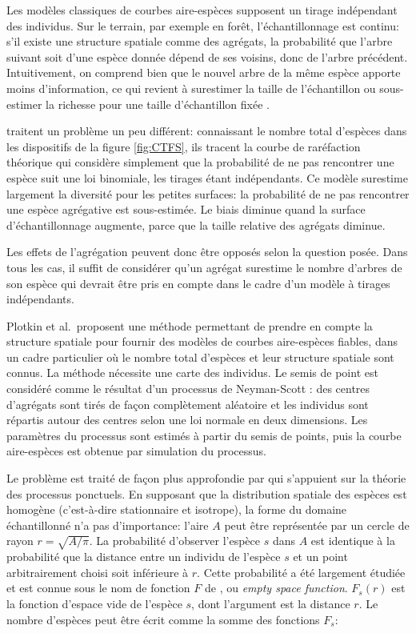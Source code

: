 \documentclass[
  11pt,
  french,
  a4paper,
  extrafontsizes,onecolumn,openright
  ]{memoir}
\newlength{\rf}
\begin{document}
Les modèles classiques de courbes aire-espèces supposent un tirage indépendant des individus.
Sur le terrain, par exemple en forêt, l'échantillonnage est continu: s'il existe une structure spatiale comme des agrégats, la probabilité que l'arbre suivant soit d'une espèce donnée dépend de ses voisins, donc de l'arbre précédent.
Intuitivement, on comprend bien que le nouvel arbre de la même espèce apporte moins d'information, ce qui revient à surestimer la taille de l'échantillon ou sous-estimer la richesse pour une taille d'échantillon fixée \autocite{Veech2005}.

\textcite{Plotkin2000a} traitent un problème un peu différent: connaissant le nombre total d'espèces dans les dispositifs de la figure \ref{fig:CTFS}, ils tracent la courbe de raréfaction théorique qui considère simplement que la probabilité de ne pas rencontrer une espèce suit une loi binomiale, les tirages étant indépendants.
Ce modèle surestime largement la diversité pour les petites surfaces: la probabilité de ne pas rencontrer une espèce agrégative est sous-estimée.
Le biais diminue quand la surface d'échantillonnage augmente, parce que la taille relative des agrégats diminue.

Les effets de l'agrégation peuvent donc être opposés selon la question posée.
Dans tous les cas, il suffit de considérer qu'un agrégat surestime le nombre d'arbres de son espèce qui devrait être pris en compte dans le cadre d'un modèle à tirages indépendants.

Plotkin et al.~proposent une méthode permettant de prendre en compte la structure spatiale pour fournir des modèles de courbes aire-espèces fiables, dans un cadre particulier où le nombre total d'espèces et leur structure spatiale sont connus.
La méthode nécessite une carte des individus.
Le semis de point est considéré comme le résultat d'un processus de Neyman-Scott \autocite{Neyman1958}: des centres d'agrégats sont tirés de façon complètement aléatoire et les individus sont répartis autour des centres selon une loi normale en deux dimensions.
Les paramètres du processus sont estimés à partir du semis de points, puis la courbe aire-espèces est obtenue par simulation du processus.

Le problème est traité de façon plus approfondie par \textcite{Picard2004} qui s'appuient sur la théorie des processus ponctuels.
En supposant que la distribution spatiale des espèces est homogène (c'est-à-dire stationnaire et isotrope), la forme du domaine échantillonné n'a pas d'importance: l'aire \(A\) peut être représentée par un cercle de rayon \(r=\sqrt{{A}/{\pi}}\).
La probabilité d'observer l'espèce \(s\) dans \(A\) est identique à la probabilité que la distance entre un individu de l'espèce \(s\) et un point arbitrairement choisi soit inférieure à \(r\).
Cette probabilité a été largement étudiée et est connue sous le nom de fonction \(F\) de \textcite{Diggle1983}, ou \emph{empty space function}.
\(F_s(r)\) est la fonction d'espace vide de l'espèce \(s\), dont l'argument est la distance \(r\).
Le nombre d'espèces peut être écrit comme la somme des fonctions \(F_s\):
\end{document}
